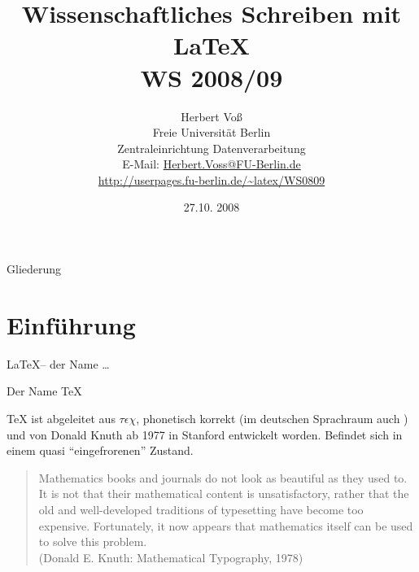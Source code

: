 \documentclass[ngerman,size=12pt,mode=present,paper=a4paper,
style=BerlinFU,mode=present]{pst-powerdot}
\title{Wissenschaftliches Schreiben mit \LaTeX\\
WS 2008/09}
\author{\tabular{@{}l}
  Herbert Voß \\
  Freie Universit\"at Berlin\\  
  Zentraleinrichtung Datenverarbeitung\\  
  E-Mail: \url{Herbert.Voss@FU-Berlin.de}\\  
  \url{http://userpages.fu-berlin.de/~latex/WS0809}
\endtabular}
\date{27.10. 2008}
\begin{document}
\maketitle

\begin{slide}[toc=,bm=]{Gliederung}
\tableofcontents[content=sections]
\end{slide}

\section{Einf\"uhrung}

\begin{slide}{\LaTeX -- der Name \ldots}

\smallskip
{}
\end{slide}


\begin{slide}{Der Name \TeX}
\begin{block}{}
\TeX{} ist abgeleitet aus $\tau\epsilon\chi$, phonetisch
	korrekt \textipa{[teX]} (im  deutschen Sprachraum auch \textipa{[te\c{c}]})
und von Donald Knuth ab 1977 in Stanford entwickelt worden. Befindet sich in einem quasi
"`eingefrorenen"' Zustand.
\end{block}
\pause
\begin{quote}
\glqq Mathematics books and journals do not
look as beautiful as they used to. It is not that their mathematical
content is unsatisfactory, rather that the old and well-developed
traditions of typesetting have become too expensive. Fortunately, it
now appears that mathematics itself can be used to solve this problem.\grqq\\
({\small\sc Donald E. Knuth: Mathematical Typography, 1978})
\end{quote}
\end{slide}
\end{document}
